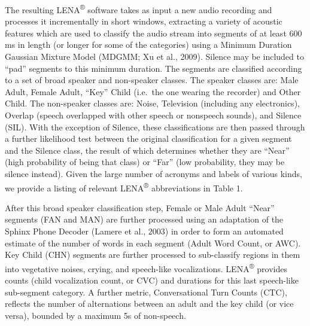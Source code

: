 \documentclass[english,table,man,floatsintext]{apa6}
\begin{document}
The resulting LENA\textsuperscript{®} software takes as input a new audio recording and processes it incrementally in short windows, extracting a variety of acoustic features which are used to classify the audio stream into segments of at least 600 ms in length (or longer for some of the categories) using a Minimum Duration Gaussian Mixture Model (MDGMM; Xu et al., 2009). Silence may be included to \enquote{pad} segments to this minimum duration. The segments are classified according to a set of broad speaker and non-speaker classes. The speaker classes are: Male Adult, Female Adult, \enquote{Key} Child (i.e.~the one wearing the recorder) and Other Child. The non-speaker classes are: Noise, Television (including any electronics), Overlap (speech overlapped with other speech or nonspeech sounds), and Silence (SIL). With the exception of Silence, these classifications are then passed through a further likelihood test between the original classification for a given segment and the Silence class, the result of which determines whether they are \enquote{Near} (high probability of being that class) or \enquote{Far} (low probability, they may be silence instead). Given the large number of acronyms and labels of various kinds, we provide a listing of relevant LENA\textsuperscript{®} abbreviations in Table 1.

After this broad speaker classification step, Female or Male Adult \enquote{Near} segments (FAN and MAN) are further processed using an adaptation of the Sphinx Phone Decoder (Lamere et al., 2003) in order to form an automated estimate of the number of words in each segment (Adult Word Count, or AWC). Key Child (CHN) segments are further processed to sub-classify regions in them into vegetative noises, crying, and speech-like vocalizations. LENA\textsuperscript{®} provides counts (child vocalization count, or CVC) and durations for this last speech-like sub-segment category. A further metric, Conversational Turn Counts (CTC), reflects the number of alternations between an adult and the key child (or vice versa), bounded by a maximum 5s of non-speech.
\end{document}
